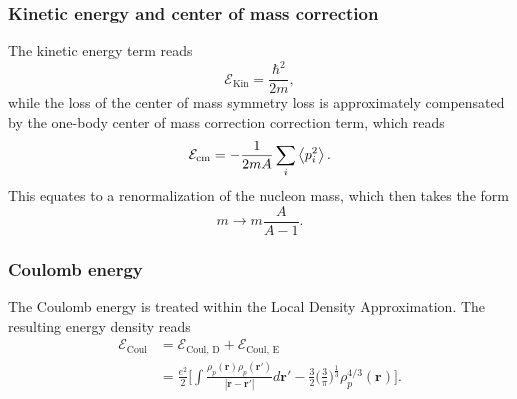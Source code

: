 \documentclass[%
 reprint, linenumbers,
 amsmath,amssymb,
 aps, physrev
]{revtex4-2}
\begin{document}
\subsubsection{Kinetic energy and center of mass correction}
The kinetic energy term reads
\begin{equation}
  \mathcal E_\text{Kin} = \frac{\hbar^2}{2m},
\end{equation}
while the loss of the center of mass symmetry loss is approximately compensated by the one-body center of mass correction correction term, which reads
\begin{equation}
  \mathcal E_\text{cm} = -\frac{1}{2mA}\sum_i \expval{p_i^2}.
\end{equation}
This equates to a renormalization of the nucleon mass, which then takes the form
\begin{equation}
  m\to m\frac{A}{A-1}.
\end{equation}
\subsubsection{Coulomb energy}
The Coulomb energy is treated within the Local Density Approximation. The resulting energy density reads~\cite{SlaterApp}
\begin{align}
    \mathcal E_\text{Coul} &=\mathcal E_{\text{Coul, D}}+\mathcal{E}_\text{Coul, E} \\&=\frac{e^2}{2}\bigg[\int  \frac{\rho_p(\bm r )\rho_p(\bm r ' )}{|\bm r-\bm r'|}d\bm r'  - \frac 3 2 \bigg(\frac 3 \pi \bigg) ^{\frac 1 3}\rho_p^{4/3}(\bm r)\bigg].\nonumber
\end{align}
\end{document}
